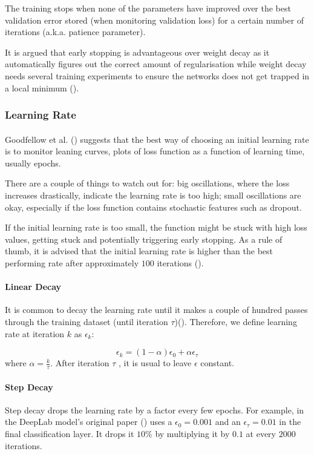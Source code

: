 The training stops when none of the parameters have improved over the best validation error stored (when monitoring validation loss) for a certain number of iterations (\gls{a.k.a.} patience parameter).

It is argued that early stopping is advantageous over weight decay as it automatically figures out the correct amount of regularisation while weight decay needs several training experiments to ensure the networks does not get trapped in a local minimum (\cite{GoodBengCour16}). 

\subsubsection{Learning Rate} \label{learning_rate}
\paragraph{}
Goodfellow et al. (\cite{GoodBengCour16}) suggests that the best way of choosing an initial learning rate is to monitor leaning curves, plots of loss function as a function of learning time, usually epochs. 

There are a couple of things to watch out for: big oscillations, where the loss increases drastically, indicate the learning rate is too high; small oscillations are okay, especially if the loss function contains stochastic features such as dropout. 

If the initial learning rate is too small, the function might be stuck with high loss values, getting stuck and potentially triggering early stopping. As a rule of thumb, it is advised that the initial learning rate is higher than the best performing rate after approximately $100$ iterations (\cite{GoodBengCour16}).
\paragraph{Linear Decay} 
It is common to decay the learning rate until it makes a couple of hundred passes through the training dataset (until iteration $\tau$)(\cite{GoodBengCour16}). Therefore, we define learning rate at iteration $k$ as $\epsilon_k$:

\begin{equation} \label{eq_linear_lr}
\epsilon_k = (1 - \alpha)\epsilon_0 + \alpha\epsilon_\tau
\end{equation}
where $\alpha=\frac{k}{\tau}$. After iteration $\tau$ , it is usual to leave $\epsilon$ constant.
\paragraph{Step Decay} 
Step decay drops the learning rate by a factor every few epochs. For example, in the DeepLab model's original paper (\cite{chen2017deeplab}) uses a $\epsilon_0=0.001$ and an $\epsilon_\tau=0.01$ in the final classification layer. It drops it $10\%$ by multiplying it by $0.1$ at every $2000$ iterations.
